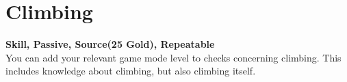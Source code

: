 \section{Climbing}\label{sec:climbing}
\textbf{Skill, Passive, Source(25 Gold), Repeatable}\\
You can add your relevant game mode level to checks concerning climbing.
This includes knowledge about climbing, but also climbing itself.